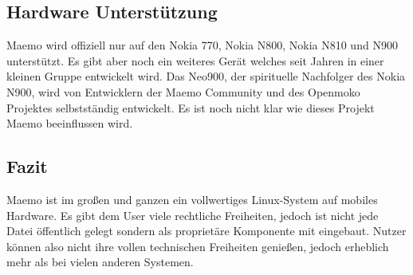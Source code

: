 \subsection{Hardware Unterstützung}
Maemo wird offiziell nur auf den Nokia 770\thinspace\cite{online:maemo1-770}, Nokia N800\thinspace\cite{online:n800-specs}, Nokia N810\thinspace\cite{online:n810-specs} und N900\thinspace\cite{online:n900-specs} unterstützt. Es gibt aber noch ein weiteres Gerät welches seit Jahren in einer kleinen Gruppe entwickelt wird. Das Neo900, der spirituelle Nachfolger des Nokia N900\thinspace\cite{online:maemo-neo900}, wird von Entwicklern der Maemo Community und des Openmoko Projektes selbstständig entwickelt\thinspace\cite{online:maemo-neo900team}. Es ist noch nicht klar wie dieses Projekt Maemo beeinflussen wird.\\

\subsection{Fazit}
Maemo ist im großen und ganzen ein vollwertiges Linux-System auf mobiles Hardware. Es gibt dem User viele rechtliche Freiheiten, jedoch ist nicht jede Datei öffentlich gelegt sondern als proprietäre Komponente mit eingebaut. Nutzer können also nicht ihre vollen technischen Freiheiten genießen, jedoch erheblich mehr als bei vielen anderen Systemen.